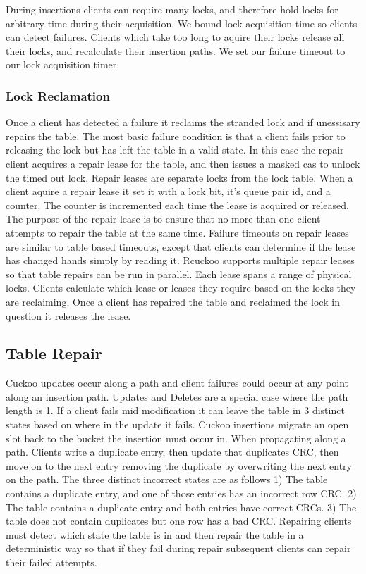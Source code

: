 During insertions clients can require many locks, and
therefore hold locks for arbitrary time during their
acquisition. We bound lock acquisition time so clients can
detect failures. Clients which take too long to aquire their
locks release all their locks, and recalculate their
insertion paths.  We set our failure timeout to  our lock acquisition timer.

\subsubsection{Lock Reclamation} Once a client has detected
a failure it reclaims the stranded lock and if unessisary
repairs the table. The most basic failure condition is that
a client fails prior to releasing the lock but has left the
table in a valid state. In this case the repair client
acquires a repair lease for the table, and then issues a
masked cas to unlock the timed out lock. Repair leases are
separate locks from the lock table. When a client aquire a
repair lease it set it with a lock bit, it's queue pair id,
and a counter. The counter is incremented each time the
lease is acquired or released. The purpose of the repair
lease is to ensure that no more than one client attempts to
repair the table at the same time. Failure timeouts on
repair leases are similar to table based timeouts, except
that clients can determine if the lease has changed hands
simply by reading it. Rcuckoo supports multiple repair
leases so that table repairs can be run in parallel. Each
lease spans a range of physical locks. Clients calculate
which lease or leases they require based on the locks they
are reclaiming. Once a client has repaired the table and
reclaimed the lock in question it releases the lease.

\subsection{Table Repair} Cuckoo updates occur along a path
and client failures could occur at any point along an
insertion path. Updates and Deletes are a special case where
the path length is 1. If a client fails mid modification it
can leave the table in 3 distinct states based on where in
the update it fails. Cuckoo insertions migrate an open slot
back to the bucket the insertion must occur in. When
propagating along a path. Clients write a duplicate entry,
then update that duplicates CRC, then move on to the next
entry removing the duplicate by overwriting the next entry
on the path. The three distinct incorrect states are as
follows 1) The table contains a duplicate entry, and one of
those entries has an incorrect row CRC. 2) The table
contains a duplicate entry and both entries have correct
CRCs. 3) The table does not contain duplicates but one row
has a bad CRC. Repairing clients must detect which state the
table is in and then repair the table in a deterministic way
so that if they fail during repair subsequent clients can
repair their failed attempts.

